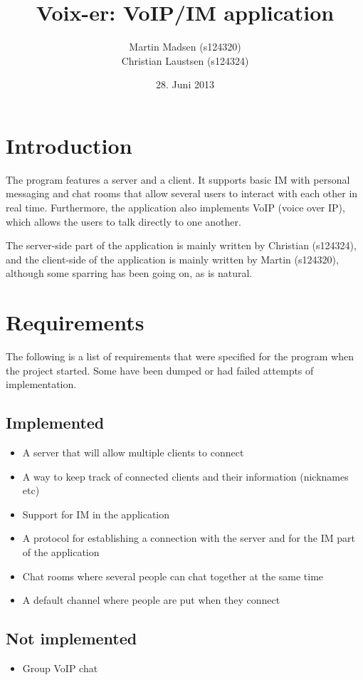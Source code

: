 \documentclass[12pt]{rapport}
\title{Voix-er: VoIP/IM application}
\author{
  Martin Madsen (s124320)\\
  Christian Laustsen (s124324)
}
\date{28. Juni 2013}
\begin{document}
\maketitle

\section*{Introduction}
The program features a server and a client. It supports basic IM with
personal messaging and chat rooms that allow several users to interact
with each other in real time. Furthermore, the application also
implements VoIP (voice over IP), which allows the users to talk
directly to one another.\newline


The server-side part of the application is mainly written by Christian
(s124324), and the client-side of the application is mainly written by
Martin (s124320), although some sparring has been going on, as is
natural.


\section*{Requirements}
The following is a list of requirements that were specified for the
program when the project started. Some have been dumped or had failed
attempts of implementation.

\subsection*{Implemented}
\begin{itemize}
  \item A server that will allow multiple clients to connect
  \item A way to keep track of connected clients and their information
    (nicknames etc)
  \item Support for IM in the application
  \item A protocol for establishing a connection with the server and
    for the IM part of the application
  \item Chat rooms where several people can chat together at the same
    time
  \item A default channel where people are put when they connect
\end{itemize}

\subsection*{Not implemented}
\begin{itemize}
  \item Group VoIP chat
\end{itemize}
\end{document}
